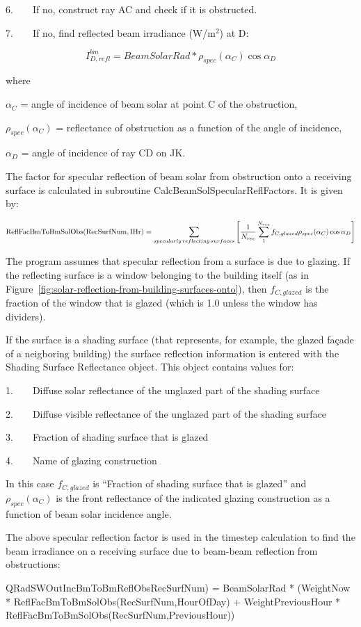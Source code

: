 6.~~~~If no, construct ray AC and check if it is obstructed.

7.~~~~If no, find reflected beam irradiance (W/m\(^{2}\)) at D:

\begin{equation}
I_{D,refl}^{bm} = BeamSolarRad*{\rho_{spec}}({\alpha_C})\cos {\alpha_D}
\end{equation}

where

\({\alpha_C}\) = angle of incidence of beam solar at point C of the obstruction,

\({\rho_{spec}}({\alpha_C})\) = reflectance of obstruction as a function of the angle of incidence,

\({\alpha_D}\) = angle of incidence of ray CD on JK.

The factor for specular reflection of beam solar from obstruction onto a receiving surface is calculated in subroutine CalcBeamSolSpecularReflFactors. It is given by:

\begin{equation}
{\rm{ReflFacBmToBmSolObs(RecSurfNum,IHr) }} = \sum\limits_{\scriptstyle \substack{specularly \, reflecting \, surfaces}} \left[ {\frac{1}{{{N_{rec}}}}\sum\limits_1^{{N_{rec}}} {{f_{C,glazed}}{\rho_{spec}}({\alpha_C})\cos {\alpha_D}} } \right]
\end{equation}

The program assumes that specular reflection from a surface is due to glazing. If the reflecting surface is a window belonging to the building itself (as in Figure~\ref{fig:solar-reflection-from-building-surfaces-onto}), then \({f_{C,glazed}}\) is the fraction of the window that is glazed (which is 1.0 unless the window has dividers).

If the surface is a shading surface (that represents, for example, the glazed façade of a neigboring building) the surface reflection information is entered with the Shading Surface Reflectance object. This object contains values for:

1.~~~~Diffuse solar reflectance of the unglazed part of the shading surface

2.~~~~Diffuse visible reflectance of the unglazed part of the shading surface

3.~~~~Fraction of shading surface that is glazed

4.~~~~Name of glazing construction

In this case \({f_{C,glazed}}\) is ``Fraction of shading surface that is glazed'' and \({\rho_{spec}}({\alpha_C})\) is the front reflectance of the indicated glazing construction as a function of beam solar incidence angle.

The above specular reflection factor is used in the timestep calculation to find the beam irradiance on a receiving surface due to beam-beam reflection from obstructions:

QRadSWOutIncBmToBmReflObsRecSurfNum) = BeamSolarRad * (WeightNow * ReflFacBmToBmSolObs(RecSurfNum,HourOfDay) + WeightPreviousHour * ReflFacBmToBmSolObs(RecSurfNum,PreviousHour))
